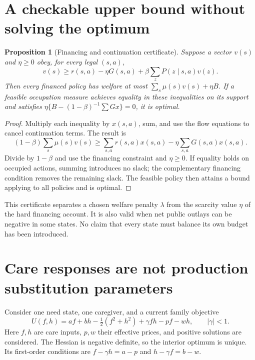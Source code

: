 \documentclass[11pt]{article}
\newtheorem{proposition}[theorem]{Proposition}
\theoremstyle{remark}
\begin{document}
\section{A checkable upper bound without solving the optimum}
\begin{proposition}[Financing and continuation certificate]
Suppose a vector $v(s)$ and $\eta\geq0$ obey, for every legal $(s,a)$,
\[
 v(s)\geq r(s,a)-\eta G(s,a)
                  +\beta\sum_zP(z\mid s,a)v(z).
\]
Then every financed policy has welfare at most
$\sum_s\mu(s)v(s)+\eta B$. If a feasible occupation measure achieves equality in these inequalities on its support and satisfies
$\eta\{B-(1-\beta)^{-1}\sum Gx\}=0$, it is optimal.
\end{proposition}
\begin{proof}
Multiply each inequality by $x(s,a)$, sum, and use the flow equations to cancel continuation terms. The result is
\[
 (1-\beta)\sum_s\mu(s)v(s)
   \geq\sum_{s,a}r(s,a)x(s,a)-\eta\sum_{s,a}G(s,a)x(s,a).
\]
Divide by $1-\beta$ and use the financing constraint and $\eta\geq0$. If equality holds on occupied actions, summing introduces no slack; the complementary financing condition removes the remaining slack. The feasible policy then attains a bound applying to all policies and is optimal.
\end{proof}

This certificate separates a chosen welfare penalty $\lambda$ from the scarcity value $\eta$ of the hard financing account. It is also valid when net public outlays can be negative in some states. No claim that every state must balance its own budget has been introduced.

\section{Care responses are not production substitution parameters}
Consider one need state, one caregiver, and a current family objective
\[
 U(f,h)=af+bh-\tfrac12(f^2+h^2)+\gamma fh-pf-wh,
 \qquad |\gamma|<1.
\]
Here $f,h$ are care inputs, $p,w$ their effective prices, and positive solutions are considered. The Hessian is negative definite, so the interior optimum is unique. Its first-order conditions are
$f-\gamma h=a-p$ and $h-\gamma f=b-w$.
\end{document}
